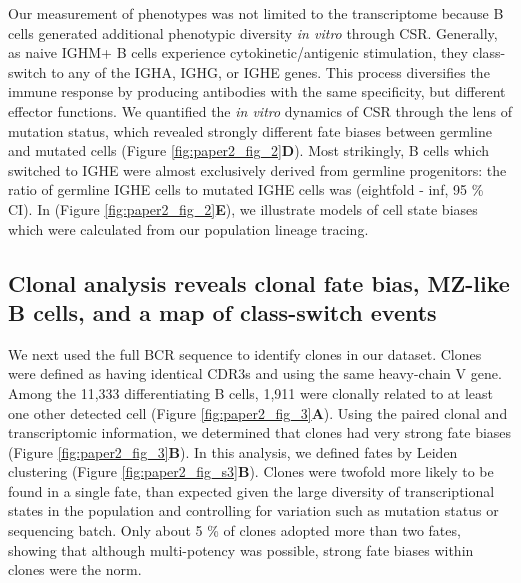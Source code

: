 Our measurement of phenotypes was not limited to the transcriptome because B cells generated additional phenotypic diversity \textit{in vitro} through CSR. Generally, as naive IGHM+ B cells experience cytokinetic/antigenic stimulation, they class-switch to any of the IGHA, IGHG, or IGHE genes. This process diversifies the immune response by producing antibodies with the same specificity, but different effector functions. We quantified the \textit{in vitro} dynamics of CSR through the lens of mutation status, which revealed strongly different fate biases between germline and mutated cells (Figure \ref{fig:paper2_fig_2}\textbf{D}). Most strikingly, B cells which switched to IGHE were almost exclusively derived from germline progenitors: the ratio of germline IGHE cells to mutated IGHE cells was (eightfold - inf, 95 \% CI). In  (Figure \ref{fig:paper2_fig_2}\textbf{E}), we illustrate models of cell state biases which were calculated from our population lineage tracing.

\subsection{Clonal analysis reveals clonal fate bias, MZ-like B cells, and a map of class-switch events
}
We next used the full BCR sequence to identify clones in our dataset. Clones were defined as having identical CDR3s and using the same heavy-chain V gene. Among the 11,333 differentiating B cells, 1,911 were clonally related to at least one other detected cell (Figure \ref{fig:paper2_fig_3}\textbf{A}). Using the paired clonal and transcriptomic information, we determined that clones had very strong fate biases (Figure \ref{fig:paper2_fig_3}\textbf{B}). In this analysis, we defined fates by Leiden clustering (Figure \ref{fig:paper2_fig_s3}\textbf{B}). Clones were twofold more likely to be found in a single fate, than expected given the large diversity of transcriptional states in the population and controlling for variation such as mutation status or sequencing batch. Only about 5 \% of clones adopted more than two fates, showing that although multi-potency was possible, strong fate biases within clones were the norm.


